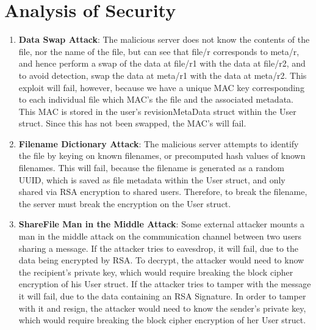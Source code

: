 \documentclass[11pt]{article}
\begin{document}
\section{Analysis of Security}
\begin{enumerate}
\item
\textbf{Data Swap Attack}: The malicious server does not know the contents of the file, nor the name of the file,
but can see that file/r corresponds to meta/r, and hence perform a swap of the data at file/r1 with the data at file/r2, and to avoid detection, swap the data at meta/r1 with the data at meta/r2. This exploit will fail, however, because we have a unique MAC key corresponding to each individual file which MAC's the file and the associated metadata. This MAC is stored in the
user's revisionMetaData struct within the User struct. Since this has not been swapped, the MAC's will fail.

\item
\textbf{Filename Dictionary Attack}: The malicious server attempts to identify the file by keying on known filenames, or precomputed hash values of known filenames. This will fail, because the filename is generated as a random UUID, which is saved as file metadata within the User struct, and only shared via RSA encryption to shared users. Therefore, to break the filename, the server must break the encryption on the User struct.

\item
\textbf{ShareFile Man in the Middle Attack}: Some external attacker mounts a man in the middle attack on the communication channel between two users sharing a message. If the attacker tries to eavesdrop, it will fail, due to the data being encrypted by RSA. To decrypt, the attacker would need to know the recipient's private key, which would require breaking the block cipher encryption of his User struct. If the attacker tries to tamper with the message it will fail, due to the data containing an RSA Signature. In order to tamper with it and resign, the attacker would need to know the sender's private key, which would require breaking the block cipher encryption of her User struct.

\end{enumerate}
\end{document}
